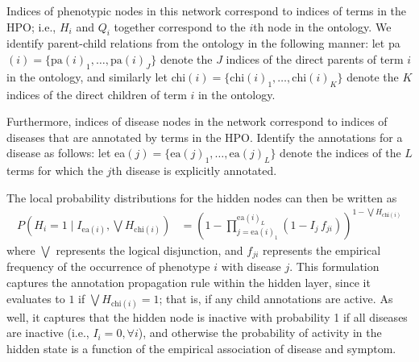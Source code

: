 Indices of phenotypic nodes in this network correspond to indices of terms in
the HPO;
%
i.e., $H_i$ and $Q_i$ together correspond to the $i$th node in the ontology.
%
We identify parent-child relations from the ontology in the following manner:
%
let pa$(i) = \{\text{pa}(i)_1, \hdots, \text{pa}(i)_J\}$ denote the $J$ indices
of the direct parents of term $i$ in the ontology, 
%
and similarly let chi$(i) = \{\text{chi}(i)_1, \hdots, \text{chi}(i)_K\}$ 
denote the $K$ indices of the direct children of term $i$ in the ontology.

Furthermore, indices of disease nodes in the network correspond to indices of
diseases that are annotated by terms in the HPO.
%
Identify the annotations for a disease as follows: let ea$(j) =
\{\text{ea}(j)_1, \hdots, \text{ea}(j)_L\}$ denote the indices of the $L$ terms
for which the $j$th disease is explicitly annotated.

The local probability distributions for the hidden nodes can then be written as
%
\begin{align}
    P \left(H_i = 1 \mid I_{\text{ea}(i)}, \bigvee H_{\text{chi}(i)}\right)
    &= \left(
        1 - \prod_{j=\text{ea}(i)_1}^{\text{ea}(i)_L}
        \left(1 - I_j \, f_{ji}\right)
    \right)
    ^{1 - \bigvee H_{\text{chi}(i)}}
    \label{eq:lpdhids}
\end{align}
%
where $\bigvee$ represents the logical disjunction, and $f_{ji}$ represents the
empirical frequency of the occurrence of phenotype $i$ with disease $j$.
%
This formulation captures the annotation propagation rule within the hidden layer,
since it evaluates to $1$ if $\bigvee H_{\text{chi}(i)} = 1$; that is, if any
child annotations are active.
%
As well, it captures that the hidden node is inactive with probability 1 if all
diseases are inactive (i.e., $I_i = 0, \forall i$), and otherwise the
probability of activity in the hidden state is a function of the empirical
association of disease and symptom.

